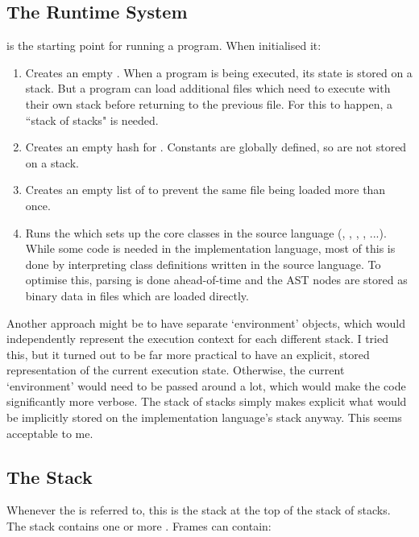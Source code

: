 \newpage
\subsection{The Runtime System}

 is the starting point for running a program. When initialised it:

\begin{enumerate}
  \item Creates an empty . When a program is being executed, its state is stored on a stack. But a program can load additional files which need to execute with their own stack before returning to the previous file. For this to happen, a ``stack of stacks" is needed.
  \item Creates an empty hash for . Constants are globally defined, so are not stored on a stack.
  \item Creates an empty list of  to prevent the same file being loaded more than once.
  \item Runs the  which sets up the core classes in the source language (, , , , ...). While some code is needed in the implementation language, most of this is done by interpreting class definitions written in the source language. To optimise this, parsing is done ahead-of-time and the AST nodes are stored as binary data in files which are loaded directly.
\end{enumerate}

Another approach might be to have separate `environment' objects, which would independently represent the execution context for each different stack. I tried this, but it turned out to be far more practical to have an explicit, stored representation of the current execution state. Otherwise, the current `environment' would need to be passed around a lot, which would make the code significantly more verbose. The stack of stacks simply makes explicit what would be implicitly stored on the implementation language's stack anyway. This seems acceptable to me.

\subsection{The Stack}

Whenever the  is referred to, this is the stack at the top of the stack of stacks. The stack contains one or more . Frames can contain:

